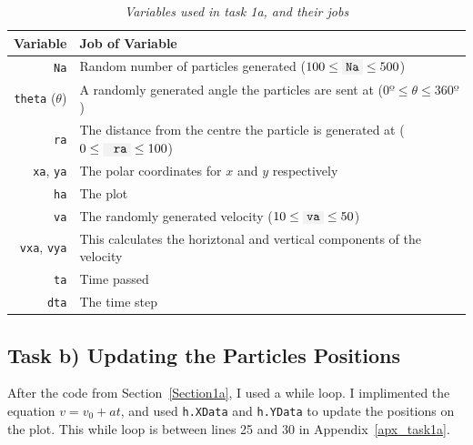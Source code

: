 \documentclass[10pt,a4paper]{article}
\newcommand{\code}[1]{\colorbox{light-gray}{\texttt{#1}}}
\begin{document}
	\begin{table}[h!] %
		\centering
	\begin{tabular}{r|l}
		Variable & Job of Variable \\
		\hline\hline
		\code{Na} 			& Random number of particles generated ($100\le \code{Na}\le 500$)\\ \hline
		\code{theta} ($\theta$)& A randomly generated angle the particles are sent at ($0º\le\theta\le360º $)\\ \hline
		\code{ra} & The distance from the centre the particle is generated at ($0\le \code{ ra}\le100$)\\ \hline
		\code{xa}, \code{ya}& The polar coordinates for $x$ and $y$ respectively\\ \hline
		\code{ha}& The plot \\ \hline
		\code{va}&The randomly generated velocity ($10\le \code{va}\le50$)\\ \hline
		\code{vxa}, \code{vya}& This calculates the horiztonal and vertical components of the velocity \\ \hline
		\code{ta}& Time passed \\ \hline
		\code{dta}& The time step
	\end{tabular}
	\caption{\label{tbl_variablestaska}\textit{Variables used in task 1a, and their jobs}}
	\end{table}
	
	\subsection{Task b) Updating the Particles Positions}
	
	After the code from Section~\ref{Section1a}, I used a while loop. I implimented the equation $v=v_0+at$, and used \code{h.XData} and \code{h.YData} to update the positions on the plot. This while loop is between lines 25 and 30 in Appendix~\ref{apx_task1a}. 
	
\end{document}
